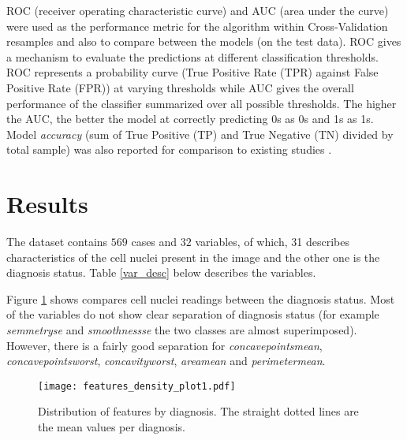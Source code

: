\noindent ROC (receiver operating characteristic curve) and AUC (area under the curve) were used as the performance metric for the algorithm within Cross-Validation resamples and also to compare between the models (on the test data). ROC gives a mechanism to evaluate the predictions at different classification thresholds. ROC represents a probability curve (True Positive Rate (TPR) against False Positive Rate (FPR)) at varying thresholds while AUC gives the overall performance of the classifier summarized over all possible thresholds. The higher the AUC, the better the model at correctly predicting 0s as 0s and 1s as 1s. Model \textit{accuracy} (sum of True Positive (TP) and True Negative (TN) divided by total sample) was also reported for comparison to existing studies \citep{james2013introduction}.

\clearpage

\section{Results}

The dataset contains $569$ cases and $32$ variables, of which, 31 describes characteristics of the cell nuclei present in the image and the other one is the diagnosis status. Table \ref{var_desc} below describes the variables.
\vspace*{-10pt}
\begin{table}[H]
\centering
\caption{\small{Variables description and summary}}\vspace{-0.3cm}
\end{table}
\vspace*{-12pt}

\noindent Figure \ref{fig:features} shows compares cell nuclei readings between the diagnosis status.  Most of the variables do not show clear separation of diagnosis status (for example \textit{semmetryse} and \textit{smoothnessse} the two classes are almost superimposed). However, there is a fairly good separation for \textit{concavepointsmean}, \textit{concavepointsworst}, \textit{concavityworst}, \textit{areamean} and \textit{perimetermean}.

\noindent\begin{figure}[H]
    \centering
    \texttt{[image: features\_density\_plot1.pdf]}\vspace{-0.3cm}
    \caption{\small{Distribution of features by diagnosis. The straight dotted lines are the mean values per diagnosis.}}\label{fig:features}
\end{figure}

